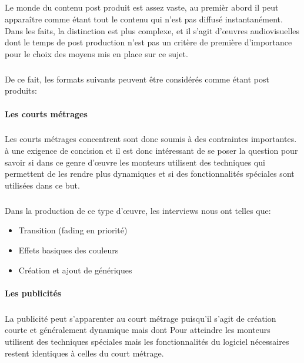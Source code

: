 \subparagraph{}

Le monde du contenu post produit est assez vaste, au premièr abord
il peut apparaître comme étant tout le contenu qui n'est pas diffusé
instantanément. Dans les faits, la distinction est plus complexe, et il
s'agit d'œuvres audiovisuelles dont le temps de post production n'est
pas un critère de première d'importance pour le choix des moyens mis
en place sur ce sujet.

\subparagraph{}

De ce fait, les formats suivants peuvent être considérés comme étant
post produits:

\paragraph{Les courts métrages}

\subparagraph{}

Les courts métrages concentrent %
sont donc soumis à des contraintes importantes.%
à une exigence de concision et il est donc intéressant de se poser la
question pour savoir si dans ce genre d'œuvre les monteurs utilisent
des techniques qui permettent de les rendre plus dynamiques et si des
fonctionnalités spéciales sont utilisées dans ce but.

\subparagraph{}

Dans la production de ce type d'œuvre, les interviews nous ont %
telles que: \begin{itemize} \setlength{\itemsep}{2mm}
  \item{Transition (fading en priorité)} \item{Effets basiques %
  des couleurs} \item{Création et ajout de génériques}
\end{itemize}

\paragraph {Les publicités}

\subparagraph{}

La publicité peut s'apparenter au court métrage puisqu'il s'agit de
création courte et généralement dynamique mais dont %
Pour atteindre %
les monteurs utilisent des techniques spéciales mais les fonctionnalités
du logiciel nécessaires restent identiques à celles du court métrage.

